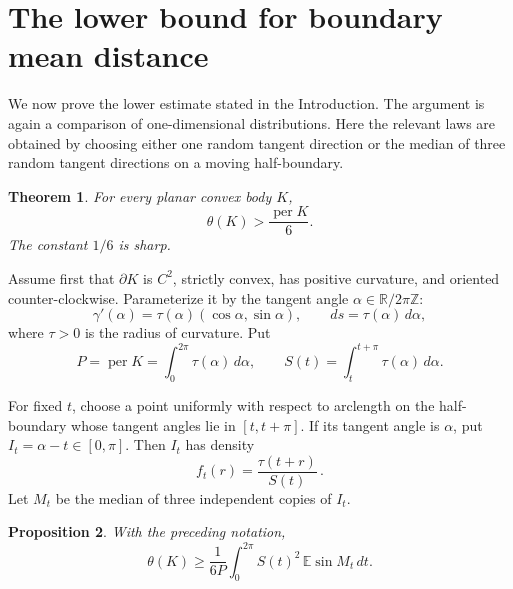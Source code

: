 \documentclass[final,12pt]{elsarticle}
\numberwithin{equation}{section}
\newtheorem{thm}{Theorem}[section]
\newtheorem{prop}[thm]{Proposition}
\theoremstyle{remark}
\theoremstyle{definition}
\begin{document}
\section{The lower bound for boundary mean distance}

We now prove the lower estimate stated in the Introduction.  The argument is again a
comparison of one-dimensional distributions.  Here the relevant laws are obtained by
choosing either one random tangent direction or the median of three random tangent
directions on a moving half-boundary.

\begin{thm}\label{thm:lower-boundary-distance}
For every planar convex body $K$,
$$
    \theta(K)>\frac{\operatorname{per}K}{6}.
$$
The constant $1/6$ is sharp.
\end{thm}

Assume first that $\partial K$ is $C^2$, strictly convex, has positive curvature, and oriented counter-clockwise.
Parameterize it by the tangent angle $\alpha\in\mathbb R/2\pi\mathbb Z$:
\begin{equation}\label{eq:tangent-parametrization}
    \gamma'(\alpha)=\tau(\alpha)(\cos\alpha,\sin\alpha),
    \qquad ds=\tau(\alpha)\,d\alpha,
\end{equation}
where $\tau>0$ is the radius of curvature.  Put
$$
    P=\operatorname{per}K=\int_0^{2\pi}\tau(\alpha)\,d\alpha,
    \qquad
    S(t)=\int_t^{t+\pi}\tau(\alpha)\,d\alpha.
$$

For fixed $t$, choose a point uniformly with respect to arclength on the half-boundary whose tangent angles lie in $[t,t+\pi]$. If its tangent angle is $\alpha$, put $I_t = \alpha-t \in[0,\pi]$. Then $I_t$ has density
\begin{equation}\label{eq:one-sample-law}
    f_t(r)=\frac{\tau(t+r)}{S(t)}\,.
\end{equation}
Let $M_t$ be the median of three independent copies of $I_t$.

\begin{prop}\label{prop:random-separator}
With the preceding notation,
\begin{equation}\label{eq:median-reduction}
    \theta(K)
    \ge \frac{1}{6P}\int_0^{2\pi}
       S(t)^2\,\mathbb E\sin M_t\,dt.
\end{equation}
\end{prop}
\end{document}
